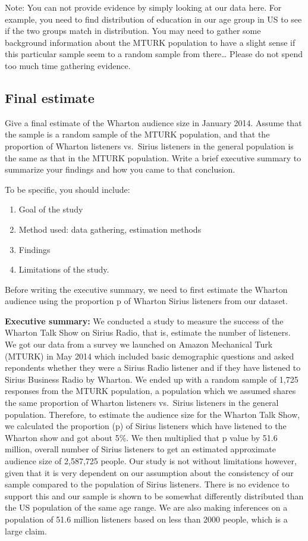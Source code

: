 \documentclass[
]{article}
\providecommand{\tightlist}{%
  \setlength{\itemsep}{0pt}\setlength{\parskip}{0pt}}
\begin{document}
Note: You can not provide evidence by simply looking at our data here.
For example, you need to find distribution of education in our age group
in US to see if the two groups match in distribution. You may need to
gather some background information about the MTURK population to have a
slight sense if this particular sample seem to a random sample from
there\ldots{} Please do not spend too much time gathering evidence.

\hypertarget{final-estimate}{%
\subsection{Final estimate}\label{final-estimate}}

Give a final estimate of the Wharton audience size in January 2014.
Assume that the sample is a random sample of the MTURK population, and
that the proportion of Wharton listeners vs.~Sirius listeners in the
general population is the same as that in the MTURK population. Write a
brief executive summary to summarize your findings and how you came to
that conclusion.

To be specific, you should include:

\begin{enumerate}
\def\labelenumi{\arabic{enumi}.}
\tightlist
\item
  Goal of the study
\item
  Method used: data gathering, estimation methods
\item
  Findings
\item
  Limitations of the study.
\end{enumerate}

Before writing the executive summary, we need to first estimate the
Wharton audience using the proportion p of Wharton Sirius listeners from
our dataset.

\textbf{Executive summary:} We conducted a study to measure the success
of the Wharton Talk Show on Sirius Radio, that is, estimate the number
of listeners. We got our data from a survey we launched on Amazon
Mechanical Turk (MTURK) in May 2014 which included basic demographic
questions and asked repondents whether they were a Sirius Radio listener
and if they have listened to Sirius Business Radio by Wharton. We ended
up with a random sample of 1,725 responses from the MTURK population, a
population which we assumed shares the same proportion of Wharton
listeners vs.~Sirius listeners in the general population. Therefore, to
estimate the audience size for the Wharton Talk Show, we calculated the
proportion (p) of Sirius listeners which have listened to the Wharton
show and got about 5\%. We then multiplied that p value by 51.6 million,
overall number of Sirius listeners to get an estimated approximate
audience size of 2,587,725 people. Our study is not without limitations
however, given that it is very dependent on our assumption about the
consistency of our sample compared to the population of Sirius
listeners. There is no evidence to support this and our sample is shown
to be somewhat differently distributed than the US population of the
same age range. We are also making inferences on a population of 51.6
million listeners based on less than 2000 people, which is a large
claim.
\end{document}
